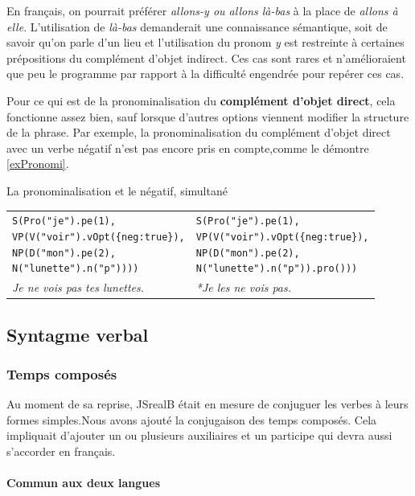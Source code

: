 \documentclass[11pt]{article} %
\newcommand{\system}[1]{\textsf{#1}}
\newcommand{\JSB}{\system{JSrealB}}
\newcommand{\real}[1]{\emph{#1}}
\begin{document}
En français, on pourrait préférer \emph{allons-y ou allons
là-bas} à la place de \emph{allons à elle}. L'utilisation de \emph{là-bas} demanderait une connaissance sémantique,
soit de savoir qu'on parle d'un lieu et l'utilisation du pronom \emph{y}
est restreinte à certaines prépositions du complément d'objet indirect.
Ces cas sont rares et n'amélioraient que peu le programme par rapport à la difficulté
engendrée pour repérer ces cas. 

Pour ce qui est de la pronominalisation du \textbf{complément d'objet
direct}, cela fonctionne assez bien, sauf lorsque d'autres options viennent
modifier la structure de la phrase. Par exemple, la pronominalisation du complément
d'objet direct avec un verbe négatif n'est pas encore pris en compte,comme le démontre
\autoref{exPronomi}.
\begin{example}
\centering
\caption{La pronominalisation et le négatif, simultané}
\begin{tabular}{p{8cm} p{8cm}}
\begin{alltt}
S(Pro("je").pe(1),
  VP(V("voir").vOpt(\{neg:true\}),
     NP(D("mon").pe(2),
        N("lunette").n("p"))))
\end{alltt} &
\begin{alltt}
S(Pro("je").pe(1),
  VP(V("voir").vOpt(\{neg:true\}),
     NP(D("mon").pe(2),
        N("lunette").n("p")).pro()))
\end{alltt} \\
\real{Je ne vois pas tes lunettes.} & \real{*Je les ne vois pas.}
\end{tabular}
\label{exPronomi}
\end{example}

\subsection{Syntagme verbal}

\subsubsection{Temps composés}

Au moment de sa reprise, \JSB{} était en mesure de conjuguer les
verbes à leurs formes simples.Nous avons ajouté la conjugaison des temps composés.
Cela impliquait d'ajouter un ou plusieurs auxiliaires et un participe qui devra
aussi s'accorder en français.

\paragraph{Commun aux deux langues}
\end{document}
